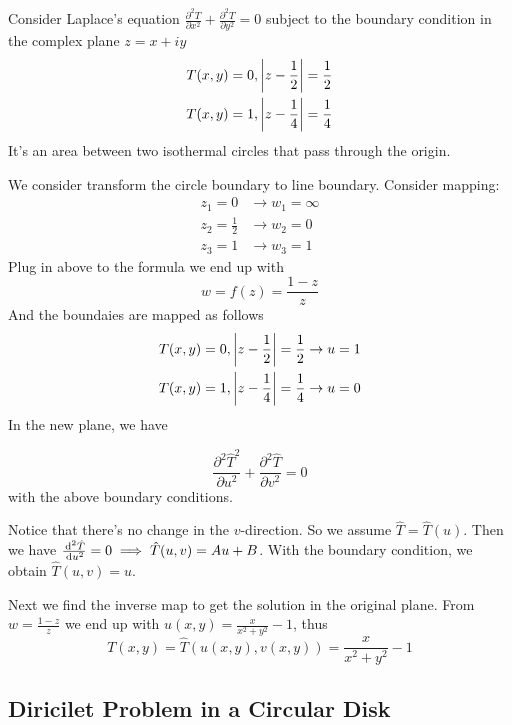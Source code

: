 \documentclass{article}
\begin{document}
\begin{myleftlinebox}
    \begin{example}
        Consider Laplace's equation \(\frac{\partial ^2 T }{\partial x^2}+\frac{\partial^2 T}{\partial y^2}=0\) subject to the boundary condition in the complex plane \(z=x+iy\)
        \begin{align*}
            T(x,y) = 0,& \left\vert z-\frac{1}{2}\right\vert=\frac{1}{2}\\
            T(x,y) = 1,& \left\vert z-\frac{1}{4}\right\vert=\frac{1}{4}
        \end{align*}
        It's an area between two isothermal circles that pass through the origin.
    \end{example}
    \tcbline
    We consider transform the circle boundary to line boundary. Consider mapping:
    \begin{align*}
        z_1=0 &\to w_1 = \infty\\
        z_2=\frac{1}{2} &\to w_2 = 0\\
        z_3=1 &\to w_3 = 1
    \end{align*}
    Plug in above to the formula we end up with
    \[w=f(z)=\frac{1-z}{z}\]
    And the boundaies are mapped as follows
    \begin{align*}
        T(x,y) = 0,& \left\vert z-\frac{1}{2}\right\vert=\frac{1}{2}\to u=1\\
        T(x,y) = 1,& \left\vert z-\frac{1}{4}\right\vert=\frac{1}{4}\to u=0
    \end{align*}
    In the new plane, we have

    \[\frac{\partial^2 \hat T^2}{\partial u^2}+\frac{\partial ^2 \hat T}{\partial v^2} = 0\] with the above boundary conditions.

    Notice that there's no change in the \(v\)-direction. So we assume \(\hat T = \hat T(u)\). Then we have \(\frac{\,\mathrm{d} ^2\hat T}{\,\mathrm{d} u^2}=0\implies \hat T(u,v)=Au+B\). With the boundary condition, we obtain \(\hat T (u,v)=u\).

    Next we find the inverse map to get the solution in the original plane. From \(w=\frac{1-z}{z}\) we end up with \(u(x,y)=\frac{x}{x^2+y^2}-1\), thus
    \[T(x,y)=\hat T(u(x,y),v(x,y))=\frac{x}{x^2+y^2}-1\]
\end{myleftlinebox}

\subsection{Diricilet Problem in a Circular Disk}
\end{document}
